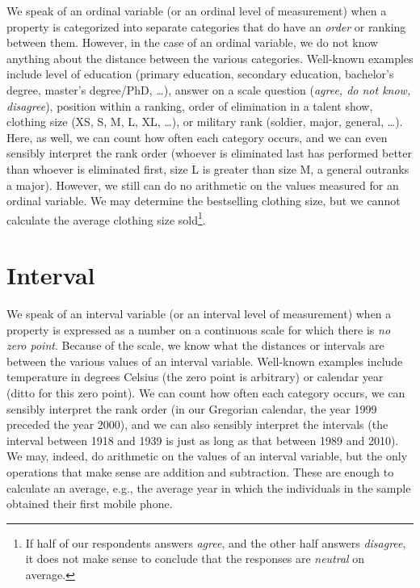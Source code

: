 \documentclass[
]{book}
\begin{document}
We speak of an ordinal variable (or an ordinal level of measurement) when a property is categorized into separate categories that do have an \emph{order} or ranking between them. However, in the case of an ordinal variable, we do not know anything about the distance between the various categories. Well-known examples include level of education (primary education, secondary education, bachelor's degree, master's degree/PhD, \ldots), answer on a scale question (\emph{agree, do not know, disagree}), position within a ranking, order of elimination in a talent show, clothing size (XS, S, M, L, XL, \ldots), or military rank (soldier, major, general, \ldots). Here, as well, we can count how often each category occurs, and we can even sensibly interpret the rank order (whoever is eliminated last has performed better than whoever is eliminated first, size L is greater than size M, a general outranks a major). However, we still can do no arithmetic on the values measured for an ordinal variable. We may determine the bestselling clothing size, but we cannot calculate the average clothing size sold\footnote{If half of our respondents answers \emph{agree}, and the other half answers \emph{disagree}, it does not make sense to conclude that the responses are \emph{neutral} on average.}.

\section{Interval}\label{sec:interval}

We speak of an interval variable (or an interval level of measurement) when a property is expressed as a number on a continuous scale for which there is \emph{no zero point}. Because of the scale, we know what the distances or intervals are between the various values of an interval variable. Well-known examples include temperature in degrees Celsius (the zero point is arbitrary) or calendar year (ditto for this zero point). We can count how often each category occurs, we can sensibly interpret the rank order (in our Gregorian calendar, the year 1999 preceded the year 2000), and we can also sensibly interpret the intervals (the interval between 1918 and 1939 is just as long as that between 1989 and 2010). We may, indeed, do arithmetic on the values of an interval variable, but the only operations that make sense are addition and subtraction. These are enough to calculate an average, e.g., the average year in which the individuals in the sample obtained their first mobile phone.
\end{document}
